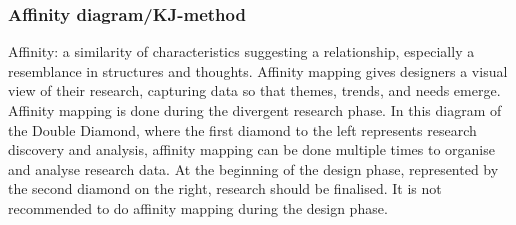 \subsubsection{Affinity diagram/KJ-method}
Affinity: a similarity of characteristics suggesting a relationship, especially a resemblance in structures and thoughts.
Affinity mapping gives designers a visual view of their research, capturing data so that themes, trends, and needs emerge.
Affinity mapping is done during the divergent research phase. In this diagram of the Double Diamond, where the first diamond to the left represents research discovery and analysis, affinity mapping can be done multiple times to organise and analyse research data. At the beginning of the design phase, represented by the second diamond on the right, research should be finalised. It is not recommended to do affinity mapping during the design phase.